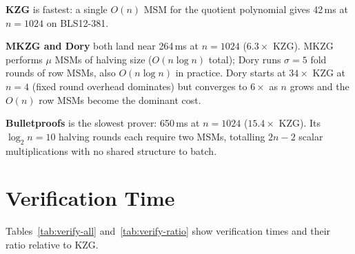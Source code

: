 \textbf{KZG} is fastest: a single $O(n)$ MSM for the quotient
polynomial gives 42\,ms at $n = 1024$ on BLS12-381.

\textbf{MKZG and Dory} both land near 264\,ms at $n = 1024$
($6.3\times$ KZG). MKZG performs $\mu$ MSMs of halving size ($O(n\log n)$
total); Dory runs $\sigma = 5$ fold rounds of row MSMs, also $O(n\log n)$
in practice. Dory starts at $34\times$ KZG at $n = 4$ (fixed round
overhead dominates) but converges to $6\times$ as $n$ grows and the
$O(n)$ row MSMs become the dominant cost.

\textbf{Bulletproofs} is the slowest prover: 650\,ms at $n = 1024$
($15.4\times$ KZG). Its $\log_2 n = 10$ halving rounds each require
two MSMs, totalling $2n - 2$ scalar multiplications with no shared
structure to batch.

\section{Verification Time}
\label{sec:verify-comparison}

Tables~\ref{tab:verify-all} and~\ref{tab:verify-ratio} show
verification times and their ratio relative to KZG.

\begin{table}[H]
\centering
\caption{Verify time (ms) at representative sizes.}
\label{tab:verify-all}
%
\end{table}

